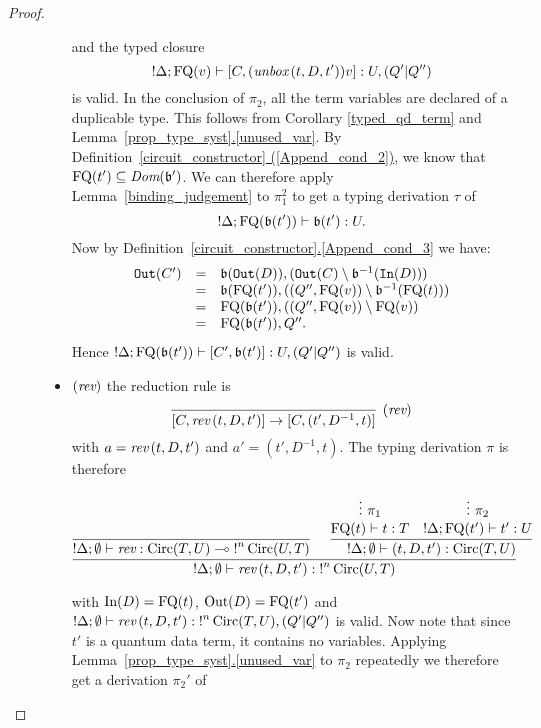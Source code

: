 \documentclass[twoside]{article}
\begin{document}
\begin{proof}
\begin{description}
\begin{itemize}
  and the typed closure
  \[
  {!}\Delta; \mathop{\textrm{FQ}}\nolimits(v) \vdash [C,(\mathop{\textit{unbox}}\nolimits\,(t,D,t'))v] :U,(Q'|Q'')
  \] 
  is valid. In the conclusion of $\pi_2$, all the 
  term variables are declared of a duplicable type. This 
  follows from Corollary \ref{typed_qd_term} and 
  Lemma~\hyperref[unused_var]{\ref*{prop_type_syst}.\ref*{unused_var}}. 
  By Definition~\hyperref[Append_cond_2]{\ref*{circuit_constructor}
  (\ref*{Append_cond_2})}, we know that $\mathop{\textrm{FQ}}\nolimits(t')\subseteq\mathop{\textit{Dom}}\nolimits(\mathfrak{b}')$. 
  We can therefore apply Lemma~\hyperref[binding_judgement]
  {\ref*{binding_judgement}} to $\pi_1^2$ to get a typing 
  derivation $\tau$ of 
  \[
  {!}\Delta;\mathop{\textrm{FQ}}\nolimits(\mathfrak{b}(t'))\vdash \mathfrak{b}(t'):U.
  \]
  Now by 
  Definition~\hyperref[Append_cond_3]{\ref*{circuit_constructor}.\ref*{Append_cond_3}} 
  we have:
  \[
  \begin{array}{rcl}
  \mathtt{Out}(C') & = & \mathfrak{b}(\mathtt{Out}(D)), (\mathtt{Out}(C)\setminus\mathfrak{b}^{-1}(\mathtt{In}(D))) \\
                   & = & \mathfrak{b}(\mathop{\textrm{FQ}}\nolimits(t')) , ((Q'',\mathop{\textrm{FQ}}\nolimits(v))\setminus \mathfrak{b}^{-1}(\mathop{\textrm{FQ}}\nolimits(t))) \\
                   & = & \mathop{\textrm{FQ}}\nolimits(\mathfrak{b}(t')) , ((Q'',\mathop{\textrm{FQ}}\nolimits(v))\setminus \mathop{\textrm{FQ}}\nolimits(v)) \\
                   & = & \mathop{\textrm{FQ}}\nolimits(\mathfrak{b}(t')),Q''.                   
  \end{array}
  \]
  Hence ${!}\Delta; \mathop{\textrm{FQ}}\nolimits(\mathfrak{b}(t'))\vdash [C',\mathfrak{b}(t')] :U,(Q'|Q'')$  is valid.
  \item $(\mathop{\textit{rev}}\nolimits)$ the reduction rule is
  \[
    \infer[(\rev)]{[C,\rev\,(t,D,t')]\to [C,(t',D^{-1},t)]}{}
  \]
  with $a=\mathop{\textit{rev}}\nolimits\,(t,D,t')$ and $a'=(t',D^{-1},t)$. The typing derivation $\pi$ 
  is therefore
  \begin{footnotesize}
  \[
  \infer[]{{!}\Delta;\emptyset\entails \rev\,(t,D,t'):{!}^n\Circ(U,T)}{
    \infer[]{{!}\Delta;\emptyset \entails \rev:\Circ(T,U)\loli {!}^n\Circ(U,T)}{
    }   
    &
    \infer[]{{!}\Delta ;\emptyset\entails (t,D,t'):\Circ(T,U)}{
      \deduce[]{\FQ(t)\entails t:T}{
        \vdots ~\pi_1
      }
      &
      \deduce[]{{!}\Delta;\FQ(t')\entails t':U}{
        \vdots ~\pi_2     
      }
    }
  }
  \]
  \end{footnotesize}  
  with $\mathop{\textrm{In}}\nolimits(D)=\mathop{\textrm{FQ}}\nolimits(t)$, $\mathop{\textrm{Out}}\nolimits(D)=\mathop{\textrm{FQ}}\nolimits(t')$ and 
  ${!}\Delta;\emptyset\vdash \mathop{\textit{rev}}\nolimits\,(t,D,t'):{!}^n\mathop{\textrm{Circ}}\nolimits(T,U),(Q'|Q'')$ is 
  valid. Now note that since $t'$ is a quantum data term, it contains no variables. 
  Applying Lemma~\hyperref[unused_var]{\ref*{prop_type_syst}.\ref*{unused_var}} 
  to $\pi_2$ repeatedly we therefore get a derivation $\pi_2'$ of 

\end{itemize}
\end{description}
\end{proof}
\end{document}
